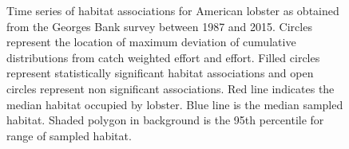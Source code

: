 \documentclass[11pt]{article}
\newcommand{\e}{/backup/bio_data/bio.lobster/figures/} %
\begin{document}
\begin{figure}

    \caption{Time series of habitat associations for American lobster as obtained from the Georges Bank survey between 1987 and 2015. Circles represent the location of maximum deviation of cumulative distributions from catch weighted effort and effort. Filled circles represent statistically significant habitat associations and open circles represent non significant associations. Red line indicates the median habitat occupied by lobster. Blue line is the median sampled habitat. Shaded polygon in background is the 95th percentile for range of sampled habitat.}

\end{figure}
\end{document}
